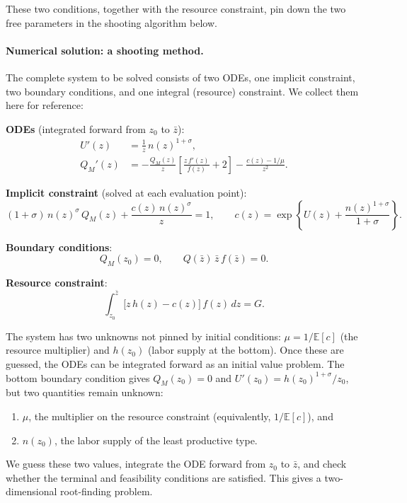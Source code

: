 \documentclass[12pt,a4paper]{article}
\theoremstyle{definition}
\theoremstyle{plain}
\theoremstyle{remark}
\newcommand{\E}{\mathbb{E}}
\newcommand{\zbar}{\bar{z}}
\newcommand{\zlow}{z_{\scriptscriptstyle 0}}
\begin{document}
These two conditions, together with the resource constraint, pin down the two free parameters in the shooting algorithm below.

\paragraph{Numerical solution: a shooting method.}

The complete system to be solved consists of two ODEs, one implicit constraint, two boundary conditions, and one integral (resource) constraint. We collect them here for reference:

\medskip
\noindent\textbf{ODEs} (integrated forward from $\zlow$ to $\zbar$):
\begin{align}
  U'(z) &= \frac{1}{z}\,n(z)^{1+\sigma}, \tag{Envelope} \\[4pt]
  Q_M'(z) &= -\frac{Q_M(z)}{z}\!\left[\frac{z\,f'(z)}{f(z)} + 2\right] - \frac{c(z) - 1/\mu}{z^2}. \tag{Optimality}
\end{align}

\noindent\textbf{Implicit constraint} (solved at each evaluation point):
\[
  (1+\sigma)\,n(z)^{\sigma}\,Q_M(z) + \frac{c(z)\,n(z)^{\sigma}}{z} = 1,
  \qquad c(z) = \exp\!\left\{U(z) + \frac{n(z)^{1+\sigma}}{1+\sigma}\right\}. \tag{$n$-solve}
\]

\noindent\textbf{Boundary conditions}:
\[
  Q_M(\zlow) = 0, \qquad Q(\zbar)\,\zbar\,f(\zbar) = 0. \tag{BC}
\]

\noindent\textbf{Resource constraint}:
\[
  \int_{\zlow}^{\zbar} \bigl[z\,h(z) - c(z)\bigr]\,f(z)\,dz = G. \tag{RC}
\]

\medskip
The system has two unknowns not pinned by initial conditions: $\mu = 1/\E[c]$ (the resource multiplier) and $h(\zlow)$ (labor supply at the bottom). Once these are guessed, the ODEs can be integrated forward as an initial value problem. The bottom boundary condition gives $Q_M(\zlow) = 0$ and $U'(\zlow) = h(\zlow)^{1+\sigma}/\zlow$, but two quantities remain unknown:
\begin{enumerate}[label=(\alph*)]
  \item $\mu$, the multiplier on the resource constraint (equivalently, $1/\E[c]$), and
  \item $n(\zlow)$, the labor supply of the least productive type.
\end{enumerate}
We guess these two values, integrate the ODE forward from $\zlow$ to $\zbar$, and check whether the terminal and feasibility conditions are satisfied. This gives a two-dimensional root-finding problem.
\end{document}
